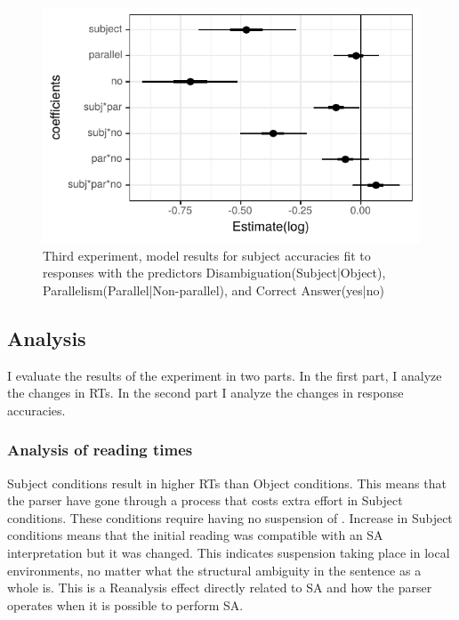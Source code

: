 \begin{knitrout}
\color{fgcolor}\begin{figure}[hbt!]

{\centering \includegraphics[]{experiments/equivalance/report/figure/exp3accuracymodel-1.pdf} 

}

\caption[Third experiment, model results for subject accuracies fit to responses with the predictors Disambiguation(Subject|Object), Parallelism(Parallel|Non-parallel), and Correct Answer(yes|no)]{Third experiment, model results for subject accuracies fit to responses with the predictors Disambiguation(Subject|Object), Parallelism(Parallel|Non-parallel), and Correct Answer(yes|no)}\label{fig:exp3accuracymodel}
\end{figure}


\end{knitrout}

\subsection{Analysis}

I evaluate the results of the experiment in two parts. In the first part, I analyze the changes in RTs. In the second part I analyze the changes in response accuracies. 

\subsubsection{Analysis of reading times}

Subject conditions result in higher RTs than Object conditions. This means that the parser have gone through a process that costs extra effort in Subject conditions. These conditions require having no suspension of {\Case}. Increase in Subject conditions means that the initial reading was compatible with an SA interpretation but it was changed. This indicates suspension taking place in local environments, no matter what the structural ambiguity in the sentence as a whole is. This is a Reanalysis effect directly related to SA and how the parser operates when it is possible to perform SA.


